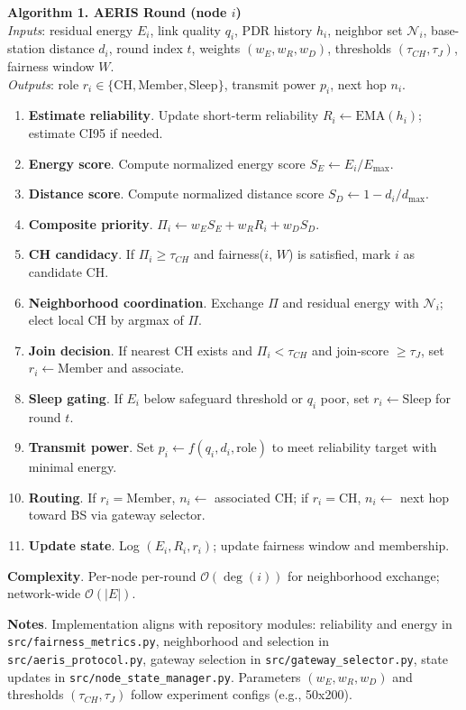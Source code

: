 
\noindent\textbf{Algorithm 1. AERIS Round (node $i$)}\\
\noindent\textit{Inputs}: residual energy $E_i$, link quality $q_i$, PDR history $h_i$, neighbor set $\mathcal{N}_i$, base-station distance $d_i$, round index $t$, weights $(w_E, w_R, w_D)$, thresholds $(\tau_{CH}, \tau_J)$, fairness window $W$.\\
\noindent\textit{Outputs}: role $r_i \in \{\mathrm{CH}, \mathrm{Member}, \mathrm{Sleep}\}$, transmit power $p_i$, next hop $n_i$.

\begin{enumerate}[leftmargin=*,labelsep=5.8mm]
  \item \textbf{Estimate reliability}. Update short-term reliability $R_i \leftarrow \mathrm{EMA}(h_i)$; estimate CI95 if needed.
  \item \textbf{Energy score}. Compute normalized energy score $S_E \leftarrow E_i / E_{\max}$.
  \item \textbf{Distance score}. Compute normalized distance score $S_D \leftarrow 1 - d_i / d_{\max}$.
  \item \textbf{Composite priority}. $\Pi_i \leftarrow w_E S_E + w_R R_i + w_D S_D$.
  \item \textbf{CH candidacy}. If $\Pi_i \ge \tau_{CH}$ and fairness($i$, $W$) is satisfied, mark $i$ as candidate CH.
  \item \textbf{Neighborhood coordination}. Exchange $\Pi$ and residual energy with $\mathcal{N}_i$; elect local CH by argmax of $\Pi$.
  \item \textbf{Join decision}. If nearest CH exists and $\Pi_i < \tau_{CH}$ and join-score $\ge \tau_J$, set $r_i \leftarrow \mathrm{Member}$ and associate.
  \item \textbf{Sleep gating}. If $E_i$ below safeguard threshold or $q_i$ poor, set $r_i \leftarrow \mathrm{Sleep}$ for round $t$.
  \item \textbf{Transmit power}. Set $p_i \leftarrow f(q_i, d_i, \mathrm{role})$ to meet reliability target with minimal energy.
  \item \textbf{Routing}. If $r_i = \mathrm{Member}$, $n_i \leftarrow$ associated CH; if $r_i = \mathrm{CH}$, $n_i \leftarrow$ next hop toward BS via gateway selector.
  \item \textbf{Update state}. Log $(E_i, R_i, r_i)$; update fairness window and membership.
\end{enumerate}

\noindent\textbf{Complexity}. Per-node per-round $\mathcal{O}(\deg(i))$ for neighborhood exchange; network-wide $\mathcal{O}(|E|)$.

\noindent\textbf{Notes}. Implementation aligns with repository modules: reliability and energy in \texttt{src/fairness\_metrics.py}, neighborhood and selection in \texttt{src/aeris\_protocol.py}, gateway selection in \texttt{src/gateway\_selector.py}, state updates in \texttt{src/node\_state\_manager.py}. Parameters $(w_E, w_R, w_D)$ and thresholds $(\tau_{CH}, \tau_J)$ follow experiment configs (e.g., 50x200).